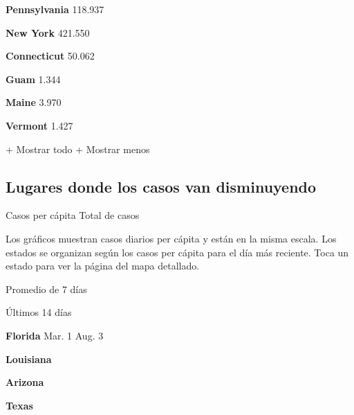 \textbf{Pennsylvania} 118.937

\href{https://www.nytimes3xbfgragh.onion/interactive/2020/us/new-york-coronavirus-cases.html}{}

\textbf{New York} 421.550

\href{https://www.nytimes3xbfgragh.onion/interactive/2020/us/connecticut-coronavirus-cases.html}{}

\textbf{Connecticut} 50.062

\textbf{Guam} 1.344

\href{https://www.nytimes3xbfgragh.onion/interactive/2020/us/maine-coronavirus-cases.html}{}

\textbf{Maine} 3.970

\href{https://www.nytimes3xbfgragh.onion/interactive/2020/us/vermont-coronavirus-cases.html}{}

\textbf{Vermont} 1.427

+ Mostrar todo + Mostrar menos

\hypertarget{lugares-donde-los-casos-van-disminuyendo}{%
\subsection{Lugares donde los casos van
disminuyendo}\label{lugares-donde-los-casos-van-disminuyendo}}

Casos per cápita Total de casos

Los gráficos muestran casos diarios per cápita y están en la misma
escala. Los estados se organizan según los casos per cápita para el día
más reciente. Toca un estado para ver la página del mapa detallado.

\href{https://www.nytimes3xbfgragh.onion/interactive/2020/us/florida-coronavirus-cases.html}{}

Promedio de 7 días

Últimos 14 días

\textbf{Florida} Mar. 1 Aug. 3

\href{https://www.nytimes3xbfgragh.onion/interactive/2020/us/louisiana-coronavirus-cases.html}{}

\textbf{Louisiana}

\href{https://www.nytimes3xbfgragh.onion/interactive/2020/us/arizona-coronavirus-cases.html}{}

\textbf{Arizona}

\href{https://www.nytimes3xbfgragh.onion/interactive/2020/us/texas-coronavirus-cases.html}{}

\textbf{Texas}

